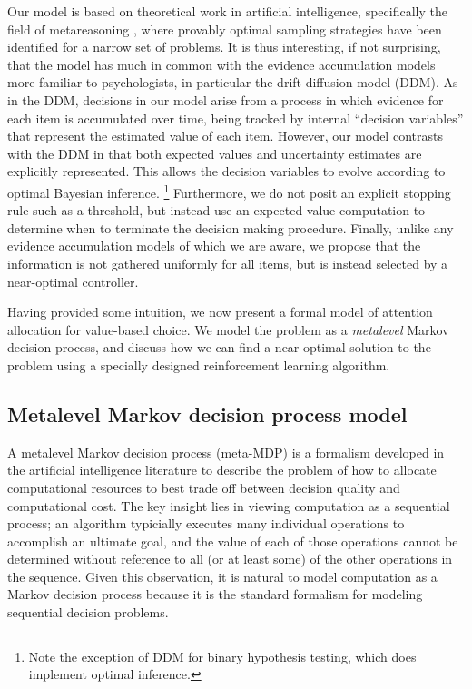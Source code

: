 \documentclass[12pt,a4paperpaper,]{article}
\begin{document}
Our model is based on theoretical work in artificial intelligence, specifically the field of metareasoning \citep{Hay2012}, where provably optimal sampling strategies have been identified for a narrow set of problems. It is thus interesting, if not surprising, that the model has much in common with the evidence accumulation models more familiar to psychologists, in particular the drift diffusion model (DDM). As in the DDM, decisions in our model arise from a process in which evidence for each item is accumulated over time, being tracked by internal ``decision variables'' that represent the estimated value of each item. However, our model contrasts with the DDM in that both expected values and uncertainty estimates are explicitly represented. This allows the decision variables to evolve according to optimal Bayesian inference.%
  \footnote{Note the exception of DDM for binary hypothesis testing, which does implement optimal inference.}
Furthermore, we do not posit an explicit stopping rule such as a threshold, but instead use an expected value computation to determine when to terminate the decision making procedure. Finally, unlike any evidence accumulation models of which we are aware, we propose that the information is not gathered uniformly for all items, but is instead selected by a near-optimal controller.

Having provided some intuition, we now present a formal model of attention allocation for value-based choice. We model the problem as a \emph{metalevel} Markov decision process, and discuss how we can find a near-optimal solution to the problem using a specially designed reinforcement learning algorithm.

\subsection{Metalevel Markov decision process
model}\label{metalevel-markov-decision-process-model}

A metalevel Markov decision process (meta-MDP) is a formalism developed in the artificial intelligence literature to describe the problem of how to allocate computational resources to best trade off between decision quality and computational cost. The key insight lies in viewing computation as a sequential process; an algorithm typicially executes many individual operations to accomplish an ultimate goal, and the value of each of those operations cannot be determined without reference to all (or at least some) of the other operations in the sequence. Given this observation, it is natural to model computation as a Markov decision process because it is the standard formalism for modeling sequential decision problems.
\end{document}
